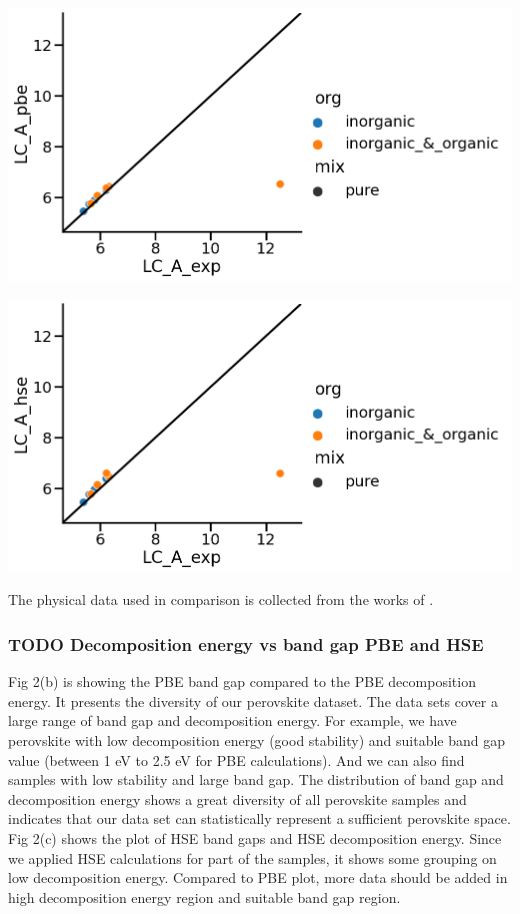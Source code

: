 \documentclass[twoside, twocolumn, 9pt, draft]{article}
\begin{document}
\begin{center}
\includegraphics[width=.9\linewidth]{pbe_v_exp_LC.png}
\end{center}
\begin{center}
\includegraphics[width=.9\linewidth]{hse_v_exp_LC.png}
\end{center}

The physical data used in comparison is collected from the works of
\citet{briones-2021-accel-lattic,jiang-2006-predic-lattic,chen-2015-under-spotl}.

\subsubsection*{{\bfseries\sffamily TODO} Decomposition energy vs band gap PBE and HSE}
\label{sec:orga0d5cda}
Fig 2(b) is showing the PBE band gap compared to the PBE decomposition
energy. It presents the diversity of our perovskite dataset. The data
sets cover a large range of band gap and decomposition energy. For
example, we have perovskite with low decomposition energy (good
stability) and suitable band gap value (between 1 eV to 2.5 eV for PBE
calculations). And we can also find samples with low stability and large
band gap. The distribution of band gap and decomposition energy shows a
great diversity of all perovskite samples and indicates that our data
set can statistically represent a sufficient perovskite space. Fig 2(c)
shows the plot of HSE band gaps and HSE decomposition energy. Since we
applied HSE calculations for part of the samples, it shows some grouping
on low decomposition energy. Compared to PBE plot, more data should be
added in high decomposition energy region and suitable band gap region.
\end{document}

